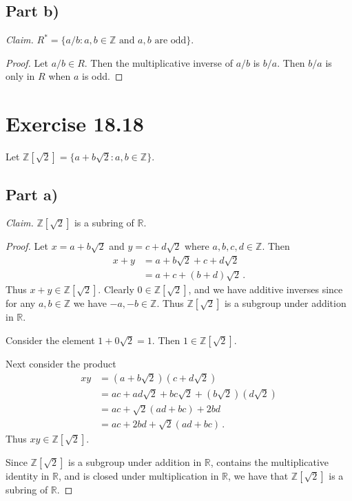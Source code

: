 \documentclass{abrice}
\newcommand{\Z}{\mathbb{Z}}
\newcommand{\R}{\mathbb{R}}
\begin{document}
\subsection{Part b)}

\emph{Claim.} $R^* = \{ a/b : a,b \in \Z \text{ and } a,b \text{ are odd} \}$.

\begin{proof}
  Let $a/b \in R$. Then the multiplicative inverse of $a/b$ is $b/a$. Then $b/a$
  is only in $R$ when $a$ is odd.
\end{proof}

\section{Exercise 18.18}

Let $\Z[\sqrt 2] = \{a + b\sqrt 2 : a,b \in \Z \}$.

\subsection{Part a)}

\emph{Claim.} $\Z[\sqrt 2]$ is a subring of $\R$.

\begin{proof}
  Let $x = a + b\sqrt 2$ and $y = c + d\sqrt{2}$ where $a,b,c,d \in \Z$. Then
  \begin{align*}
    x + y
    &= a + b\sqrt 2 + c + d\sqrt 2 \\
    &= a + c + (b + d)\sqrt 2\, .
  \end{align*}
  Thus $x + y \in \Z[\sqrt 2]$. Clearly $0 \in \Z[\sqrt 2]$, and we have
  additive inverses since for any $a,b \in \Z$ we have $-a, -b \in \Z$. Thus
  $\Z[\sqrt 2]$ is a subgroup under addition in $\R$.

  Consider the element $1 + 0 \sqrt 2 = 1$. Then $1 \in \Z[\sqrt 2]$.

  Next consider the product
  \begin{align*}
    xy
    &= (a + b\sqrt 2) (c + d \sqrt 2) \\
    &= a c + a d \sqrt 2 + b c \sqrt 2 + (b \sqrt 2)(d \sqrt 2) \\
    &= a c + \sqrt 2 (ad + bc) + 2bd \\
    & = ac + 2bd + \sqrt 2(ad + bc)\, .
  \end{align*}
  Thus $xy \in \Z[\sqrt 2]$.

  Since $\Z[\sqrt 2]$ is a subgroup under addition in $\R$, contains the
  multiplicative identity in $\R$, and is closed under multiplication in $\R$,
  we have that $\Z[\sqrt 2]$ is a subring of $\R$.
\end{proof}
\end{document}
